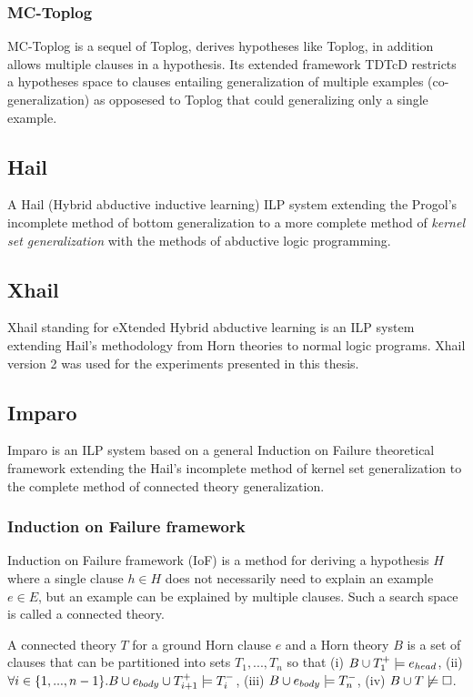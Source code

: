 \subsubsection{MC-Toplog\cite{muggleton2012mc}}
MC-Toplog is a sequel of Toplog, derives hypotheses like Toplog, in addition allows multiple clauses in a hypothesis. Its extended framework TDTcD restricts a hypotheses space to clauses entailing generalization of multiple examples (co-generalization) as opposesed to Toplog that could generalizing only a single example.

\subsection{Hail\cite{ray2003hybrid}\cite{ray2005phdHybrid}}
A Hail (Hybrid abductive inductive learning) ILP system extending the Progol's incomplete method of bottom generalization to a more complete method of \emph{kernel set generalization} with the methods of abductive logic programming.

\subsection{Xhail\cite{ray2009nonmonotonic}}
Xhail standing for eXtended Hybrid abductive learning is an ILP system extending Hail's methodology from Horn theories to normal logic programs.
Xhail version 2 was used for the experiments presented in this thesis.

\subsection{Imparo}\cite{kimber2012learning}
Imparo is an ILP system based on a general Induction on Failure theoretical framework extending the Hail's incomplete method of kernel set generalization to the complete method of connected theory generalization.
\subsubsection{Induction on Failure framework\cite{kimber2012learning}}
Induction on Failure framework (IoF) is a method for deriving a hypothesis $H$ where a single clause $h \in H$ does not necessarily need to explain an example $e \in E$, but an example can be explained by multiple clauses. Such a search space is called a connected theory.
\begin{defn}
A connected theory $T$ for a ground Horn clause $e$ and a Horn theory $B$ is a set of clauses that can be partitioned into sets $T_1, ..., T_n$ so that
(i) $B \cup T_1^+ \models e_{head}$,
(ii) $\forall i \in \{1, ..., n-1\}. B \cup e_{body} \cup T_{i+1}^+ \models T_i^-$,
(iii) $B \cup e_{body} \models T_n^-$,
(iv) $B \cup T \not\models \square$.
\end{defn}

